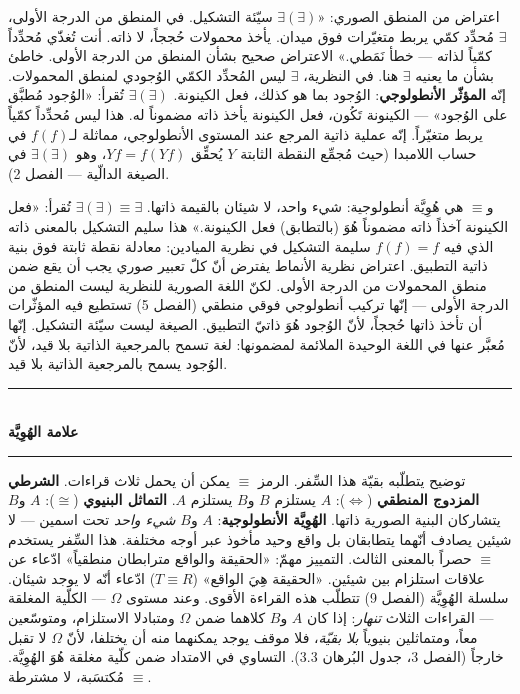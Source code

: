 \documentclass[10pt, openany, oneside]{book}
\renewcommand{\normalsize}{\fontsize{10}{13}\selectfont}
\begin{document}
اعتراض من المنطق الصوري: «$\exists(\exists)$ سيّئة التشكيل. في المنطق من الدرجة الأولى، $\exists$ مُحدِّد كمّي يربط متغيّرات فوق ميدان. يأخذ محمولات حُججاً، لا ذاته. أنت تُغذّي مُحدِّداً كمّياً لذاته --- خطأ نَمَطي.» الاعتراض صحيح بشأن المنطق من الدرجة الأولى. خاطئ بشأن ما يعنيه $\exists$ هنا. في النظرية، $\exists$ ليس المُحدِّد الكمّي الوُجودي لمنطق المحمولات. إنّه \textbf{المؤثّر الأنطولوجي}: الوُجود بما هو كذلك، فعل الكينونة. $\exists(\exists)$ تُقرأ: «الوُجود مُطبَّق على الوُجود» --- الكينونة تَكُون، فعل الكينونة يأخذ ذاته مضموناً له. هذا ليس مُحدِّداً كمّياً يربط متغيّراً. إنّه عملية ذاتية المرجع عند المستوى الأنطولوجي، مماثلة لـ$f(f)$ في حساب اللامبدا (حيث مُجمِّع النقطة الثابتة $Y$ يُحقِّق $Yf = f(Yf)$، وهو $\exists(\exists)$ في الصيغة الدالّية --- الفصل 2).

و$\equiv$ هي هُوِيَّة أنطولوجية: شيء واحد، لا شيئان بالقيمة ذاتها. $\exists(\exists) \equiv \exists$ تُقرأ: «فعل الكينونة آخذاً ذاته مضموناً هُوَ (بالتطابق) فعل الكينونة.» هذا سليم التشكيل بالمعنى ذاته الذي فيه $f(f) = f$ سليمة التشكيل في نظرية الميادين: معادلة نقطة ثابتة فوق بنية ذاتية التطبيق. اعتراض نظرية الأنماط يفترض أنّ كلّ تعبير صوري يجب أن يقع ضمن منطق المحمولات من الدرجة الأولى. لكنّ اللغة الصورية للنظرية ليست المنطق من الدرجة الأولى --- إنّها تركيب أنطولوجي فوقي منطقي (الفصل 5) تستطيع فيه المؤثّرات أن تأخذ ذاتها حُججاً، لأنّ الوُجود هُوَ ذاتيّ التطبيق. الصيغة ليست سيّئة التشكيل. إنّها مُعبَّر عنها في اللغة الوحيدة الملائمة لمضمونها: لغة تسمح بالمرجعية الذاتية بلا قيد، لأنّ الوُجود يسمح بالمرجعية الذاتية بلا قيد.


\begin{center}
    \rule{0.3\textwidth}{0.4pt}\\[0.5em]
    {\normalsize\bfseries علامة الهُوِيَّة}\\[0.3em]
    \rule{0.3\textwidth}{0.4pt}
\end{center}

\vspace{1em}

توضيح يتطلّبه بقيّة هذا السِّفر. الرمز $\equiv$ يمكن أن يحمل ثلاث قراءات. \textbf{الشرطي المزدوج المنطقي} ($\iff$): $A$ يستلزم $B$ و$B$ يستلزم $A$. \textbf{التماثل البنيوي} ($\cong$): $A$ و$B$ يتشاركان البنية الصورية ذاتها. \textbf{الهُوِيَّة الأنطولوجية}: $A$ و$B$ \textit{شيء واحد} تحت اسمين --- لا شيئين يصادف أنّهما يتطابقان بل واقع وحيد مأخوذ عبر أوجه مختلفة. هذا السِّفر يستخدم $\equiv$ حصراً بالمعنى الثالث. التمييز مهمّ: «الحقيقة والواقع مترابطان منطقياً» ادّعاء عن علاقات استلزام بين شيئين. «الحقيقة هِيَ الواقع» ($T \equiv R$) ادّعاء أنّه لا يوجد شيئان. سلسلة الهُوِيَّة (الفصل 9) تتطلّب هذه القراءة الأقوى. وعند مستوى $\Omega$ --- الكلّية المغلقة --- القراءات الثلاث \textit{تنهار}: إذا كان $A$ و$B$ كلاهما ضمن $\Omega$ ومتبادلا الاستلزام، ومتوسّعين معاً، ومتماثلين بنيوياً \textit{بلا بقيّة}، فلا موقف يوجد يمكنهما منه أن يختلفا، لأنّ $\Omega$ لا تقبل خارجاً (الفصل 3، جدول البُرهان 3.3). التساوي في الامتداد ضمن كلّية مغلقة هُوَ الهُوِيَّة. $\equiv$ مُكتسَبة، لا مشترطة.
\end{document}
